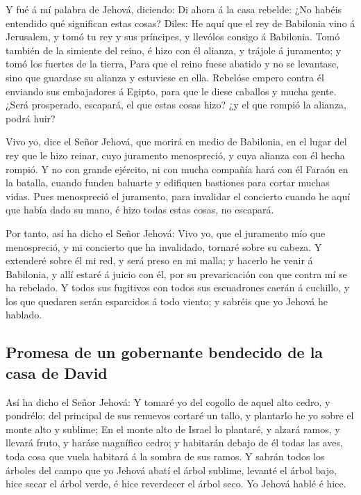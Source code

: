  Y fué á mí palabra de Jehová, diciendo:  Di
ahora á la casa rebelde: ¿No habéis entendido qué significan estas
cosas? Diles: He aquí que el rey de Babilonia vino á Jerusalem, y tomó
tu rey y sus príncipes, y llevólos consigo á Babilonia. 
Tomó también de la simiente del reino, é hizo con él alianza, y trájole
á juramento; y tomó los fuertes de la tierra,  Para que el
reino fuese abatido y no se levantase, sino que guardase su alianza y
estuviese en ella.  Rebelóse empero contra él enviando sus
embajadores á Egipto, para que le diese caballos y mucha gente. ¿Será
prosperado, escapará, el que estas cosas hizo? ¿y el que rompió la
alianza, podrá huir?

 Vivo yo, dice el Señor Jehová, que morirá en medio de
Babilonia, en el lugar del rey que le hizo reinar, cuyo juramento
menospreció, y cuya alianza con él hecha rompió.  Y no con
grande ejército, ni con mucha compañía hará con él Faraón en la batalla,
cuando funden baluarte y edifiquen bastiones para cortar muchas vidas.
 Pues menospreció el juramento, para invalidar el concierto
cuando he aquí que había dado su mano, é hizo todas estas cosas, no
escapará.

 Por tanto, así ha dicho el Señor Jehová: Vivo yo, que el
juramento mío que menospreció, y mi concierto que ha invalidado, tornaré
sobre su cabeza.  Y extenderé sobre él mi red, y será preso
en mi malla; y hacerlo he venir á Babilonia, y allí estaré á juicio con
él, por su prevaricación con que contra mí se ha rebelado. 
Y todos sus fugitivos con todos sus escuadrones caerán á cuchillo, y los
que quedaren serán esparcidos á todo viento; y sabréis que yo Jehová he
hablado.

\hypertarget{promesa-de-un-gobernante-bendecido-de-la-casa-de-david}{%
\subsection{Promesa de un gobernante bendecido de la casa de
David}\label{promesa-de-un-gobernante-bendecido-de-la-casa-de-david}}

 Así ha dicho el Señor Jehová: Y tomaré yo del cogollo de
aquel alto cedro, y pondrélo; del principal de sus renuevos cortaré un
tallo, y plantarlo he yo sobre el monte alto y sublime;  En
el monte alto de Israel lo plantaré, y alzará ramos, y llevará fruto, y
haráse magnífico cedro; y habitarán debajo de él todas las aves, toda
cosa que vuela habitará á la sombra de sus ramos.  Y sabrán
todos los árboles del campo que yo Jehová abatí el árbol sublime,
levanté el árbol bajo, hice secar el árbol verde, é hice reverdecer el
árbol seco. Yo Jehová hablé é hice.

